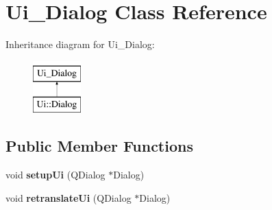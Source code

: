 \hypertarget{classUi__Dialog}{\section{\-Ui\-\_\-\-Dialog \-Class \-Reference}
\label{classUi__Dialog}
}
\-Inheritance diagram for \-Ui\-\_\-\-Dialog\-:\begin{figure}[H]
\begin{center}
\leavevmode
\includegraphics[height=2.000000cm]{classUi__Dialog}
\end{center}
\end{figure}
\subsection*{\-Public \-Member \-Functions}
\begin{DoxyCompactItemize}
\item 
\hypertarget{classUi__Dialog_a4f6a478c3ecdafabffb17b39cb26444a}{void {\bfseries setup\-Ui} (\-Q\-Dialog $\ast$\-Dialog)}\label{classUi__Dialog_a4f6a478c3ecdafabffb17b39cb26444a}

\item 
\hypertarget{classUi__Dialog_afa0ccb6f716ca6178260522a193c250e}{void {\bfseries retranslate\-Ui} (\-Q\-Dialog $\ast$\-Dialog)}\label{classUi__Dialog_afa0ccb6f716ca6178260522a193c250e}

\end{DoxyCompactItemize}
